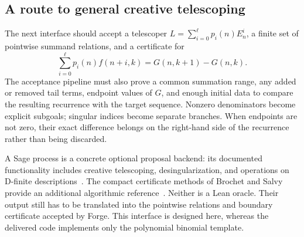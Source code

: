 \subsection{A route to general creative telescoping}

The next interface should accept a telescoper
$L=\sum_{i=0}^\ell p_i(n)E_n^i$, a finite set of pointwise summand relations,
and a certificate for
\[
 \sum_{i=0}^\ell p_i(n)f(n+i,k)=G(n,k+1)-G(n,k).
\]
The acceptance pipeline must also prove a common summation range, any added or
removed tail terms, endpoint values of $G$, and enough initial data to compare
the resulting recurrence with the target sequence. Nonzero denominators become
explicit subgoals; singular indices become separate branches. When endpoints
are not zero, their exact difference belongs on the right-hand side of the
recurrence rather than being discarded.

A Sage  process is a concrete optional proposal backend:
its documented functionality includes creative telescoping, desingularization,
and operations on D-finite descriptions~\cite{ore-algebra}. The compact
certificate methods of Brochet and Salvy provide an additional algorithmic
reference~\cite{brochet-salvy}. Neither is a Lean oracle. Their output still has
to be translated into the pointwise relations and boundary certificate accepted
by Forge. This interface is designed here, whereas the delivered code implements
only the polynomial binomial template.
